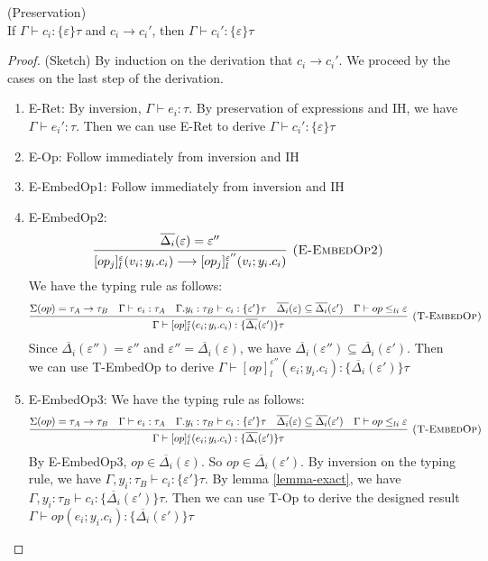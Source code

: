 \begin{lemma} (Preservation) \\
If $\Gamma \vdash c_i : \{\varepsilon\} \tau$ and $c_i \longrightarrow c_i'$, then $\Gamma \vdash c_i' : \{\varepsilon\}\tau$

\begin{proof} (Sketch)
By induction on the derivation that $c_i \longrightarrow c_i'$. We proceed by the cases on the last step of the derivation.

\begin{enumerate}
\item E-Ret: By inversion, $\Gamma \vdash e_i: \tau$. By preservation of expressions and IH, we have  $\Gamma \vdash e_i': \tau$. Then we can use E-Ret to derive $\Gamma  \vdash c_i' : \{\varepsilon\} \tau$
\item E-Op: Follow immediately from inversion and IH
\item E-EmbedOp1: Follow immediately from inversion and IH
\item E-EmbedOp2:  
$$\infer[\textsc{(E-EmbedOp2)}]
{[op_j]^\varepsilon_l(v_i; y_i.c_i) \longrightarrow [op_j]^{\varepsilon''}_l(v_i; y_i.c_i) }
{\overline{\Delta_i}(\varepsilon) = \varepsilon''} \quad $$
We have the typing rule as follows:
$$\infer[\textsc{(T-EmbedOp)}]
  {\Gamma\vdash [op]^\varepsilon_l(e_i; y_i.c_i) : \{\overline{\Delta_i}(\varepsilon')\}\tau }
  {\Sigma(op) = \tau_A \rightarrow \tau_B & \Gamma \vdash e_i : \tau_A & \Gamma. y_i:\tau_B\vdash c_i: \{\varepsilon'\}\tau & \overline{\Delta_i}(\varepsilon) \subseteq \overline{\Delta_i}(\varepsilon') & \Gamma \vdash op \leq_{li} \varepsilon}  $$
  Since $\overline{\Delta_i}(\varepsilon'') = \varepsilon''$ and $\varepsilon'' = \overline{\Delta_i}(\varepsilon)$, we have $\overline{\Delta_i}(\varepsilon'')  \subseteq \overline{\Delta_i}(\varepsilon')$. Then we can use T-EmbedOp to derive $\Gamma\vdash [op]^{\varepsilon''}_l(e_i; y_i.c_i) : \{\overline{\Delta_i}(\varepsilon')\}\tau $
\item E-EmbedOp3:
  We have the typing rule as follows:
$$\infer[\textsc{(T-EmbedOp)}]
  {\Gamma\vdash [op]^\varepsilon_l(e_i; y_i.c_i) : \{\overline{\Delta_i}(\varepsilon')\}\tau }
  {\Sigma(op) = \tau_A \rightarrow \tau_B & \Gamma \vdash e_i : \tau_A & \Gamma. y_i:\tau_B\vdash c_i: \{\varepsilon'\}\tau & \overline{\Delta_i}(\varepsilon) \subseteq \overline{\Delta_i}(\varepsilon') & \Gamma \vdash op \leq_{li} \varepsilon}  $$
  By E-EmbedOp3, $op \in \overline{\Delta_i}(\varepsilon)$. So $op \in \overline{\Delta_i}(\varepsilon')$. 
By inversion on the typing rule, we have $\Gamma, y_i:\tau_B\vdash c_i: \{\varepsilon'\}\tau$. By lemma \ref{lemma-exact}, we have $\Gamma, y_i:\tau_B\vdash c_i: \{\overline{\Delta_i}(\varepsilon')\}\tau$. Then we can use T-Op to derive the designed result $\Gamma \vdash op(e_i; y_i.c_i) : \{\overline{\Delta_i}(\varepsilon')\}\tau $


\end{enumerate}
\end{proof}
\end{lemma}
